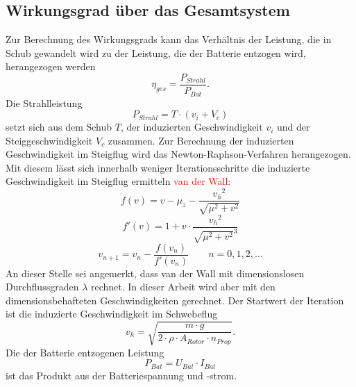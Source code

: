 \subsection{Wirkungsgrad über das Gesamtsystem}
Zur Berechnung des Wirkungsgrads kann das Verhältnis der Leistung, die in Schub gewandelt wird zu der Leistung, die der Batterie entzogen wird, herangezogen werden
\begin{equation}
	\eta_{ges} = \frac{P_{Strahl}}{P_{Bat}}.
\end{equation}
Die Strahlleistung 
\begin{equation}
	P_{Strahl} = T\cdot (v_i + V_c)
\end{equation}
setzt sich aus dem Schub \ensuremath{T}, der induzierten Geschwindigkeit \ensuremath{v_i} und der Steiggeschwindigkeit \ensuremath{V_c} zusammen.
Zur Berechnung der induzierten Geschwindigkeit im Steigflug wird das Newton-Raphson-Verfahren herangezogen. Mit diesem lässt sich innerhalb weniger Iterationsschritte die induzierte Geschwindigkeit im Steigflug ermitteln \textcolor{red}{van der Wall}:
\begin{equation}
	f(v) = v-\mu_z-\frac{{v_h}^2}{\sqrt{\mu^2+v^2}}
\end{equation}
\begin{equation}
	f'(v) = 1 + v\cdot\frac{{v_h}^2}{\sqrt{\mu^2+v^2}^3}
\end{equation}
\begin{equation}
	v_{n+1} = v_n - \frac{f(v_n)}{f'(v_n)}\qquad n = 0,1,2,\dots
\end{equation}
An dieser Stelle sei angemerkt, dass van der Wall mit dimensionslosen Durchflussgraden \ensuremath{\lambda} rechnet. In dieser Arbeit wird aber mit den dimensionsbehafteten Geschwindigkeiten gerechnet.
Der Startwert der Iteration ist die induzierte Geschwindigkeit im Schwebeflug
\begin{equation}
	v_h = \sqrt{\frac{m\cdot g}{2\cdot\rho\cdot A_{Rotor}\cdot n_{Prop}}}.
\end{equation}
Die der Batterie entzogenen Leistung
\begin{equation}
	P_{Bat} = U_{Bat}\cdot I_{Bat}
\end{equation}
ist das Produkt aus der Batteriespannung und -strom.


